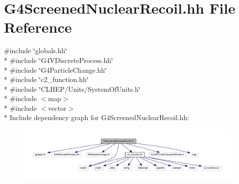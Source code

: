 \hypertarget{G4ScreenedNuclearRecoil_8hh}{}\section{G4\+Screened\+Nuclear\+Recoil.\+hh File Reference}
\label{G4ScreenedNuclearRecoil_8hh}
{\ttfamily \#include \char`\"{}globals.\+hh\char`\"{}}\\*
{\ttfamily \#include \char`\"{}G4\+V\+Discrete\+Process.\+hh\char`\"{}}\\*
{\ttfamily \#include \char`\"{}G4\+Particle\+Change.\+hh\char`\"{}}\\*
{\ttfamily \#include \char`\"{}c2\+\_\+function.\+hh\char`\"{}}\\*
{\ttfamily \#include \char`\"{}C\+L\+H\+E\+P/\+Units/\+System\+Of\+Units.\+h\char`\"{}}\\*
{\ttfamily \#include $<$map$>$}\\*
{\ttfamily \#include $<$vector$>$}\\*
Include dependency graph for G4\+Screened\+Nuclear\+Recoil.\+hh\+:
\nopagebreak
\begin{figure}[H]
\begin{center}
\leavevmode
\includegraphics[width=350pt]{G4ScreenedNuclearRecoil_8hh__incl}
\end{center}
\end{figure}
